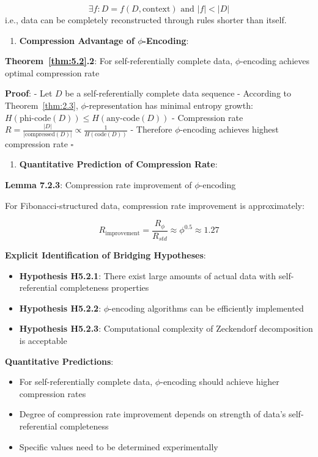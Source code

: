\begin{equation}
\exists f: D = f(D, \text{context}) \text{ and } |f| < |D|
\end{equation}
   i.e., data can be completely reconstructed through rules shorter than itself.

\begin{enumerate}
\item \textbf{Compression Advantage of $\phi$-Encoding}:
\end{enumerate}
   \textbf{Theorem~\ref{thm:5.2}.2}: For self-referentially complete data, $\phi$-encoding achieves optimal compression rate
\label{thm:5.2}
   
   \textbf{Proof}:
   - Let $D$ be a self-referentially complete data sequence
   - According to Theorem~\ref{thm:2.3}, $\phi$-representation has minimal entropy growth: $H(\text{phi-code}(D)) \leq H(\text{any-code}(D))$
   - Compression rate $R = \frac{|D|}{|\text{compressed}(D)|} \propto \frac{1}{H(\text{code}(D))}$
   - Therefore $\phi$-encoding achieves highest compression rate $\square$

\begin{enumerate}
\item \textbf{Quantitative Prediction of Compression Rate}:
\end{enumerate}
   \textbf{Lemma 7.2.3}: Compression rate improvement of $\phi$-encoding
\label{thm:5.2}
   
   For Fibonacci-structured data, compression rate improvement is approximately:
   
\begin{equation}
R_{\text{improvement}} = \frac{R_\phi}{R_{std}} \approx \phi^{0.5} \approx 1.27
\end{equation}

\textbf{Explicit Identification of Bridging Hypotheses}:
\begin{itemize}
\item \textbf{Hypothesis H5.2.1}: There exist large amounts of actual data with self-referential completeness properties
\item \textbf{Hypothesis H5.2.2}: $\phi$-encoding algorithms can be efficiently implemented
\item \textbf{Hypothesis H5.2.3}: Computational complexity of Zeckendorf decomposition is acceptable
\end{itemize}

\textbf{Quantitative Predictions}:
\begin{itemize}
\item For self-referentially complete data, $\phi$-encoding should achieve higher compression rates
\item Degree of compression rate improvement depends on strength of data's self-referential completeness
\item Specific values need to be determined experimentally
\end{itemize}

